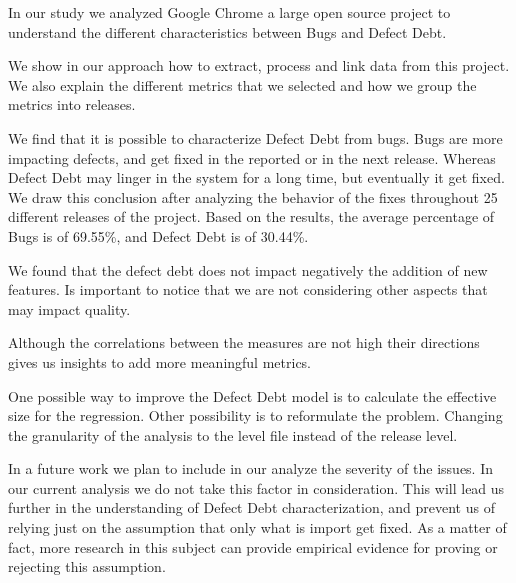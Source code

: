 In our study we analyzed Google Chrome a large open source project to understand the different characteristics between Bugs and Defect Debt. 

We show in our approach how to extract, process and link data from this project. We also explain the different metrics that we selected and how we group the metrics into releases. 

We find that it is possible to characterize Defect Debt from bugs. Bugs are more impacting defects, and get fixed in the reported or in the next release. Whereas Defect Debt may linger in the system for a long time, but eventually it get fixed. We draw this conclusion after analyzing the behavior of the fixes throughout 25 different releases of the project. Based on the results, the average percentage of Bugs is of 69.55\%, and Defect Debt is of 30.44\%.

We found that the defect debt does not impact negatively the addition of new features. Is important to notice that we are not considering other aspects that may impact quality.  

Although the correlations between the measures are not high their directions gives us insights to add more meaningful metrics.

One possible way to improve the Defect Debt model is to calculate the effective size for the regression. Other possibility is to reformulate the problem. Changing the granularity of the analysis to the level file instead of the release level. 

In a future work we plan to include in our analyze the severity of the issues. In our current analysis we do not take this factor in consideration. This will lead us further in the understanding of Defect Debt characterization, and prevent us of relying just on the assumption that only what is import get fixed. As a matter of fact, more research in this subject can provide empirical evidence for proving or rejecting this assumption.